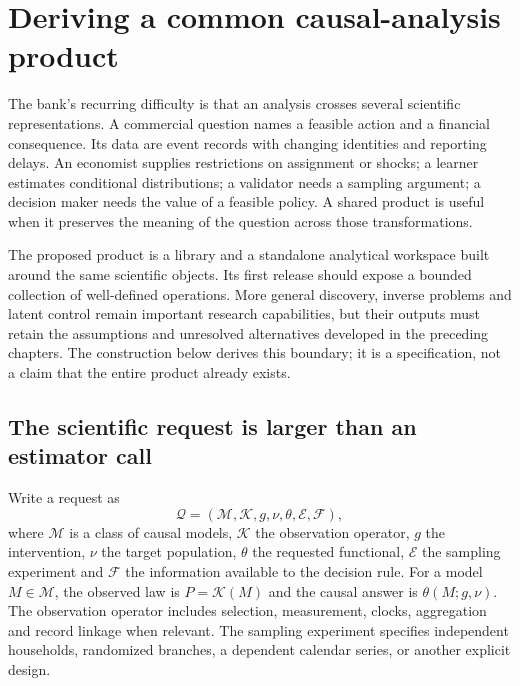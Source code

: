 \chapter{Deriving a common causal-analysis product}
\label{r3:product}

The bank's recurring difficulty is that an analysis crosses several
scientific representations. A commercial question names a feasible action
and a financial consequence. Its data are event records with changing
identities and reporting delays. An economist supplies restrictions on
assignment or shocks; a learner estimates conditional distributions; a
validator needs a sampling argument; a decision maker needs the value of
a feasible policy. A shared product is useful when it preserves the
meaning of the question across those transformations.

The proposed product is a library and a standalone analytical workspace
built around the same scientific objects. Its first release should expose
a bounded collection of well-defined operations. More general discovery,
inverse problems and latent control remain important research capabilities,
but their outputs must retain the assumptions and unresolved alternatives
developed in the preceding chapters. The construction below derives this
boundary; it is a specification, not a claim that the entire product
already exists.

\section{The scientific request is larger than an estimator call}
\label{r3:request-type}

Write a request as
\begin{equation}
 \mathcal Q=(\mathcal M,\mathcal K,g,\nu,\theta,\mathcal E,\mathcal F),
 \label{r3:request}
\end{equation}
where $\mathcal M$ is a class of causal models, $\mathcal K$ the observation
operator, $g$ the intervention, $\nu$ the target population, $\theta$
the requested functional, $\mathcal E$ the sampling experiment and
$\mathcal F$ the information available to the decision rule. For a model
$M\in\mathcal M$, the observed law is $P=\mathcal K(M)$ and the causal
answer is $\theta(M;g,\nu)$. The observation operator includes selection,
measurement, clocks, aggregation and record linkage when relevant.
The sampling experiment specifies independent households, randomized
branches, a dependent calendar series, or another explicit design.

